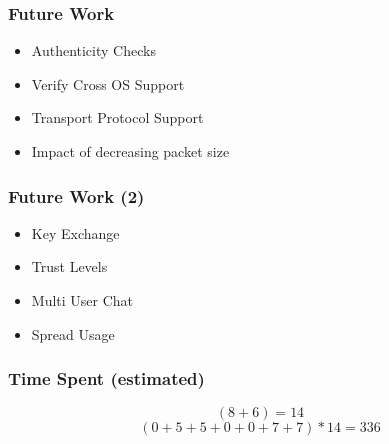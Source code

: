 \documentclass{beamer}
\begin{document}
\frame
{
  \frametitle{Future Work}
  \begin{itemize}
    \item Authenticity Checks
    \item Verify Cross OS Support
    \item Transport Protocol Support
    \item Impact of decreasing packet size
  \end{itemize}
}


\frame
{
  \frametitle{Future Work (2)}
  \begin{itemize}
    \item Key Exchange
    \item Trust Levels
    \item Multi User Chat
    \item Spread Usage
  \end{itemize}
}

\frame
{
  \frametitle{Time Spent (estimated)}
    $$(8+6) = 14$$
    $$(0+5+5+0+0+7+7)*14 = 336$$
}



\end{document}
